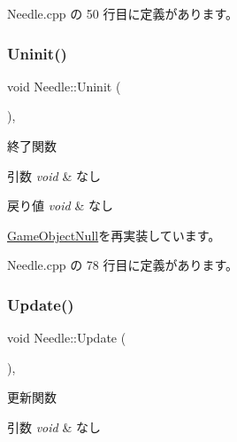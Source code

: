  Needle.\+cpp の 50 行目に定義があります。

\mbox{\label{class_needle_a077c40beda665b249522349df0f16da1}} 
\subsubsection{\texorpdfstring{Uninit()}{Uninit()}}
{\footnotesize\ttfamily void Needle\+::\+Uninit (\begin{DoxyParamCaption}{ }\end{DoxyParamCaption})\hspace{0.3cm}{\ttfamily [override]}, {\ttfamily [virtual]}}



終了関数 


\begin{DoxyParams}{引数}
{\em void} & なし \\
\hline
\end{DoxyParams}

\begin{DoxyRetVals}{戻り値}
{\em void} & なし \\
\hline
\end{DoxyRetVals}


\mbox{\hyperlink{class_game_object_null_a1a70fbd3260fd1c0100320756830a0db}{Game\+Object\+Null}}を再実装しています。



 Needle.\+cpp の 78 行目に定義があります。

\mbox{\label{class_needle_adf4790c9ad674b809ae576a09a3ee2f2}} 
\subsubsection{\texorpdfstring{Update()}{Update()}}
{\footnotesize\ttfamily void Needle\+::\+Update (\begin{DoxyParamCaption}{ }\end{DoxyParamCaption})\hspace{0.3cm}{\ttfamily [override]}, {\ttfamily [virtual]}}



更新関数 


\begin{DoxyParams}{引数}
{\em void} & なし \\
\hline
\end{DoxyParams}

